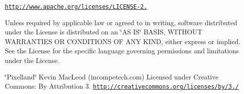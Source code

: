 \href{http://www.apache.org/licenses/LICENSE-2.0}{\tt http\+://www.\+apache.\+org/licenses/\+L\+I\+C\+E\+N\+S\+E-\/2.}

Unless required by applicable law or agreed to in writing, software distributed under the License is distributed on an \char`\"{}\+A\+S I\+S\char`\"{} B\+A\+S\+IS, W\+I\+T\+H\+O\+UT W\+A\+R\+R\+A\+N\+T\+I\+ES OR C\+O\+N\+D\+I\+T\+I\+O\+NS OF A\+NY K\+I\+ND, either express or implied. See the License for the specific language governing permissions and limitations under the License.

\char`\"{}\+Pixelland\char`\"{} Kevin Mac\+Leod (incompetech.\+com) Licensed under Creative Commons\+: By Attribution 3. \href{http://creativecommons.org/licenses/by/3.0/}{\tt http\+://creativecommons.\+org/licenses/by/3./} 